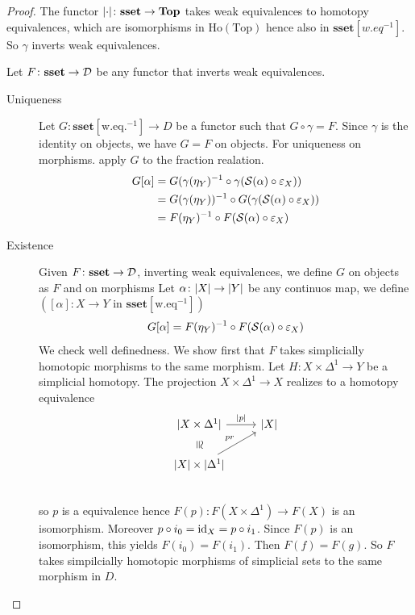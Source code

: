\documentclass[language=english]{TemplateLecture}
\begin{document}
\begin{proof}
    The functor \(\lvert\cdot\rvert \colon \mathbf{sset}\to \mathbf{Top}\) takes weak equivalences to homotopy equivalences, which are isomorphisms in \(\mathrm{Ho}(\mathrm{Top})\) hence also in \(\mathbf{sset}[w.eq^{-1}]\). So \(\gamma\) inverts weak equivalences.

    Let \(F\colon \mathbf{sset}\to \mathcal{D}\) be any functor that inverts weak equivalences.
    \begin{description}
        \item[Uniqueness] Let \(G\colon \mathbf{sset}[\mathrm{w.eq.}^{-1}]\to D\) be a functor such that \(G \circ \gamma = F\). Since \(\gamma\) is the identity on objects, we have \(G = F\) on objects. For uniqueness on morphisms. apply \(G\) to the fraction realation.
        \[\begin{split}
            G[\alpha] &= G(\gamma(\eta_Y)^{-1}\circ \gamma(\mathcal{S}(\alpha)\circ \varepsilon_X)) \\
            &= G(\gamma(\eta_Y))^{-1} \circ G(\gamma(\mathcal{S}(\alpha)\circ \varepsilon_X)) \\
            &= F(\eta_Y)^{-1} \circ F(\mathcal{S}(\alpha) \circ \varepsilon_X) \\
        \end{split}\]
        \item[Existence] Given \(F\colon \mathbf{sset} \to \mathcal{D}\), inverting weak equivalences, we define \(G\) on objects as \(F\) and on morphisms Let \(\alpha\colon \lvert X\rvert \to \lvert Y\rvert\) be any continuos map, we define \(([\alpha]\colon X \to Y \text{ in } \mathbf{sset}[\mathrm{w.eq}^{-1}])\)
        \[G[\alpha] = F(\eta_Y)^{-1} \circ F(\mathcal{S}(\alpha)\circ \varepsilon_X)\]
        We check well definedness. We show first that \(F\) takes simplicially homotopic morphisms to the same morphism.
        Let \(H\colon X \times \Delta^1\to Y\) be a simplicial homotopy. The projection \(X\times \Delta^1\to X\) realizes to a homotopy equivalence
        \[\begin{tikzcd}
            \abs{X\times \Delta^1} \ar[d, phantom, sloped, "\cong"]\ar[r, "\abs p"] & \abs X \\
            \abs X \times \abs {\Delta^1} \ar[ru, "pr"] \\
        \end{tikzcd}\]
        so \(p\) is a equivalence hence \(F(p)\colon F(X\times \Delta^1)\to F(X)\) is an isomorphism. Moreover \(p\circ i_0 = \operatorname{id}_X = p\circ i_1\). Since \(F(p)\) is an isomorphism, this yields \(F(i_0) = F(i_1)\). Then \(F(f) = F(g)\). So \(F\) takes simpilcially homotopic morphisms of simplicial sets to the same morphism in \(D\).


\end{description}
\end{proof}
\end{document}
